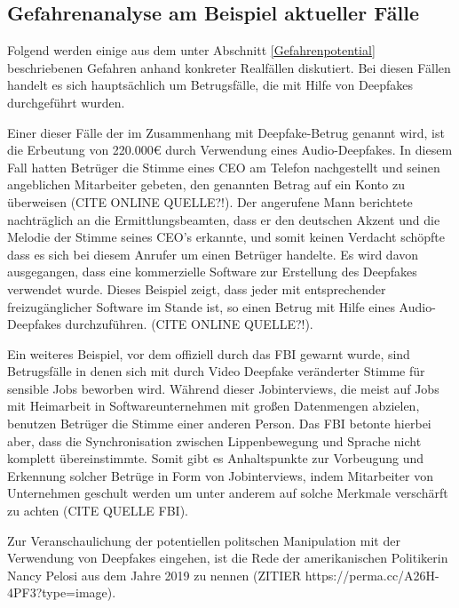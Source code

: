 \subsection{Gefahrenanalyse am Beispiel aktueller Fälle}\label{GefahrenAktuelleFaelle}
Folgend werden einige aus dem unter Abschnitt \ref{Gefahrenpotential} beschriebenen Gefahren anhand konkreter Realfällen diskutiert.
Bei diesen Fällen handelt es sich hauptsächlich um Betrugsfälle, die mit Hilfe von Deepfakes durchgeführt wurden.
\par
Einer dieser Fälle der im Zusammenhang mit Deepfake-Betrug genannt wird, ist die Erbeutung von 220.000\euro{} durch Verwendung eines Audio-Deepfakes.
In diesem Fall hatten Betrüger die Stimme eines CEO am Telefon nachgestellt und seinen angeblichen Mitarbeiter gebeten, den genannten Betrag auf ein Konto zu überweisen (CITE ONLINE QUELLE?!).
Der angerufene Mann berichtete nachträglich an die Ermittlungsbeamten, dass er den deutschen Akzent und die Melodie der Stimme seines CEO's erkannte, und somit keinen Verdacht schöpfte dass es sich bei diesem Anrufer um einen Betrüger handelte.
Es wird davon ausgegangen, dass eine kommerzielle Software zur Erstellung des Deepfakes verwendet wurde.
Dieses Beispiel zeigt, dass jeder mit entsprechender freizugänglicher Software im Stande ist, so einen Betrug mit Hilfe eines Audio-Deepfakes durchzuführen. (CITE ONLINE QUELLE?!).
\par
Ein weiteres Beispiel, vor dem offiziell durch das FBI gewarnt wurde, sind Betrugsfälle in denen sich mit durch Video Deepfake veränderter Stimme für sensible Jobs beworben wird.
Während dieser Jobinterviews, die meist auf Jobs mit Heimarbeit in Softwareunternehmen mit großen Datenmengen abzielen, benutzen Betrüger die Stimme einer anderen Person.
Das FBI betonte hierbei aber, dass die Synchronisation zwischen Lippenbewegung und Sprache nicht komplett übereinstimmte.
Somit gibt es Anhaltspunkte zur Vorbeugung und Erkennung solcher Betrüge in Form von Jobinterviews, indem Mitarbeiter von Unternehmen geschult werden um unter anderem auf solche Merkmale verschärft zu achten (CITE QUELLE FBI).
\par
Zur Veranschaulichung der potentiellen politschen Manipulation mit der Verwendung von Deepfakes eingehen, ist die Rede der amerikanischen Politikerin Nancy Pelosi aus dem Jahre 2019 zu nennen (ZITIER https://perma.cc/A26H-4PF3?type=image).
